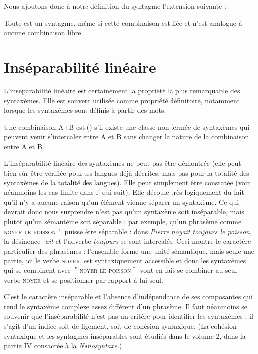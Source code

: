 Nous ajoutons donc à notre définition du syntagme l’extension suivante :

{Toute  est un syntagme, même si cette combinaison est liée et n’est analogue à aucune combinaison libre.}

\section{Inséparabilité linéaire}\label{sec:3.1.15}

L’inséparabilité linéaire est certainement la propriété la plus remarquable des syntaxèmes. Elle est souvent utilisée comme propriété définitoire, notamment lorsque les syntaxèmes sont définis à partir des mots.

{Une combinaison A+B est ()  s’il existe une classe non fermée de syntaxèmes qui peuvent venir s’intercaler entre A et B sans changer la nature de la combinaison entre A et B.}

 L’inséparabilité linéaire des syntaxèmes ne peut pas être démontrée (elle peut bien sûr être vérifiée pour les langues déjà décrites, mais pas pour la totalité des syntaxèmes de la totalité des langues). Elle peut simplement être constatée (voir néanmoins les cas limite dans l’ qui suit). Elle découle très logiquement du fait qu’il n’y a aucune raison qu’un élément vienne séparer un syntaxème. Ce qui devrait donc nous surprendre n’est pas qu’un syntaxème soit inséparable, mais plutôt qu’un sémantème soit séparable ; par exemple, qu’un phrasème comme $⌜$\textsc{noyer} \textsc{le} \textsc{poisson}$⌝$ puisse être séparable : dans \textit{Pierre noyait toujours le poisson}, la désinence \textit{{}-ait} et l’adverbe \textit{toujours} se sont intercalés. Ceci montre le caractère particulier des phrasèmes : l’ensemble forme une unité sémantique, mais seule une partie, ici le verbe \textsc{noyer}, est syntaxiquement accessible et donc les syntaxèmes qui se combinent avec $⌜$\textsc{noyer} \textsc{le} \textsc{poisson}$⌝$ vont en fait se combiner au seul verbe \textsc{noyer} et se positionner par rapport à lui seul.

C’est le caractère inséparable et l’absence d’indépendance de ses composantes qui rend le syntaxème complexe assez différent d’un phrasème. Il faut néanmoins se souvenir que l’inséparabilité n’est pas un critère pour identifier les syntaxèmes : il s’agit d’un indice soit de figement, soit de cohésion syntaxique. (La cohésion syntaxique et les syntagmes inséparables sont étudiés dans le volume 2, dans la partie IV consacrée à la \textit{Nanosyntaxe}.)

